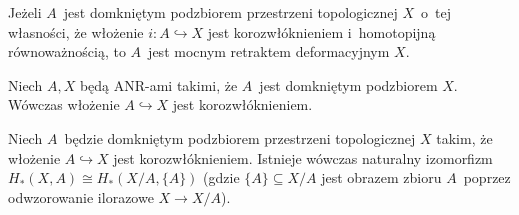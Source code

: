 \begin{lem}\label{lem-wlozenie_hom_rown_to_retrakcja_sdr}
Jeżeli $A$~jest domkniętym podzbiorem przestrzeni topologicznej $X$~o~tej własności, że włożenie $i\colon A\hookrightarrow X$ jest korozwłóknieniem i~homotopijną równoważnością, to $A$~jest mocnym retraktem deformacyjnym $X$.
\end{lem}

\begin{stw}\label{stw-domkniety_podzbior_anr_jest_korozwloknieniem}
Niech $A,X$ będą ANR-ami takimi, że $A$~jest domkniętym podzbiorem $X$. Wówczas włożenie $A\hookrightarrow X$ jest korozwłóknieniem. 
\end{stw}

\begin{stw}\label{stw-homologie_ilorazu}
Niech $A$~będzie domkniętym podzbiorem przestrzeni topologicznej $X$ takim, że włożenie $A\hookrightarrow X$ jest korozwłóknieniem. Istnieje wówczas naturalny izomorfizm $H_*(X,A)\cong {H}_*(X\big/A,\{A\})$ (gdzie $\{A\}\subseteq X\big/A$ jest obrazem zbioru $A$~poprzez odwzorowanie ilorazowe $X\to X\big/A$).
\end{stw}






